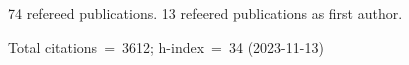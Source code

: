 74 refereed publications. 13 refeered publications as first author.

Total citations~=~3612; h-index~=~34 (2023-11-13)